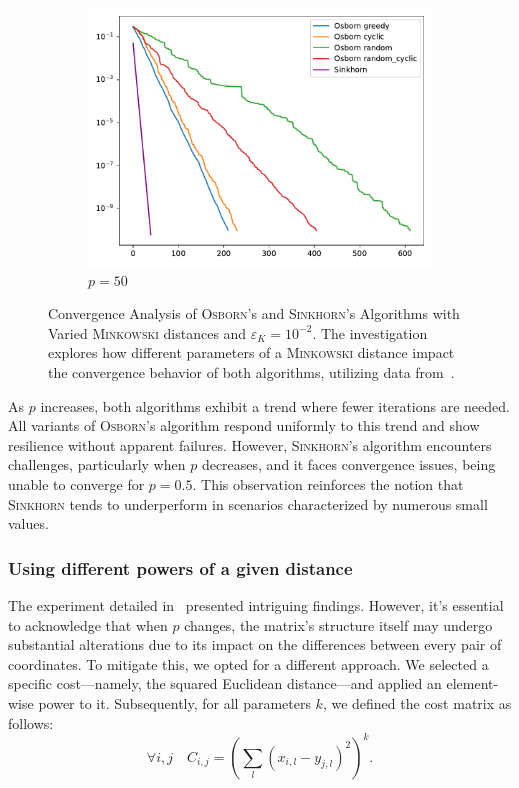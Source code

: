 \begin{figure}[H]
\begin{subfigure}[b]{.18\textwidth}
        \includegraphics[width=\textwidth]{figures/minkowski/osborn_vs_sinkhorn_dist2_0.01_1e-10_50_50}
        \caption{\(p = 50\)}
    \end{subfigure}
    \caption{Convergence Analysis of \textsc{Osborn}'s and \textsc{Sinkhorn}'s Algorithms with Varied \textsc{Minkowski} distances and \(\varepsilon_K = 10^{-2}\). The investigation explores how different parameters of a \textsc{Minkowski} distance impact the convergence behavior of both algorithms, utilizing data from~.}
\end{figure}

As \(p\) increases, both algorithms exhibit a trend where fewer iterations are needed. All variants of \textsc{Osborn}'s algorithm respond uniformly to this trend and show resilience without apparent failures. However, \textsc{Sinkhorn}'s algorithm encounters challenges, particularly when \(p\) decreases, and it faces convergence issues, being unable to converge for \(p = 0.5\). This observation reinforces the notion that \textsc{Sinkhorn} tends to underperform in scenarios characterized by numerous small values.

\subsubsection{Using different powers of a given distance}

The experiment detailed in~ presented intriguing findings. However, it's essential to acknowledge that when \(p\) changes, the matrix's structure itself may undergo substantial alterations due to its impact on the differences between every pair of coordinates. To mitigate this, we opted for a different approach. We selected a specific cost—namely, the squared Euclidean distance—and applied an element-wise power to it. Subsequently, for all parameters \(k\), we defined the cost matrix as follows:
\[
    \forall i,j \quad C_{i,j} = \left(\sum_l (x_{i,l} - y_{j,l})^2\right)^k.
\]


